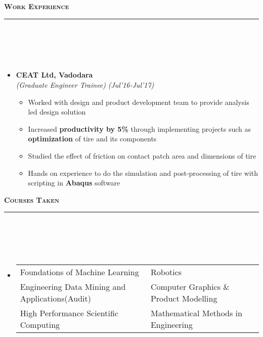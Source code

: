 \documentclass[a4paper,10pt]{article}
\newcommand{\isep}{-2 pt}
\newcommand{\lsep}{-0.5cm}
\newcommand{\resheading}[1]{{\small
        {
            \begin{minipage}
                {0.992\textwidth}\textbf{{\textsc{#1 \vphantom{p\^{E}} }}}
                \\[-0.3cm]
                \hrule
            \end{minipage}
            \\[-0.5cm]
        }
 }}
\begin{document}
\resheading{\textbf{\large Work Experience}}\\[\lsep]
\\[-0.2cm]
\begin{itemize}
    \item \textbf{CEAT Ltd, Vadodara}\\
\emph{(Graduate Engineer Trainee)} \hfill \emph{(Jul'16-Jul'17)}
        \\ [-0.6cm]
        \begin{itemize}\itemsep \isep
	\item Worked with design and product development team to provide analysis led design solution
	\item Increased \textbf{productivity by 5\%} through implementing projects such as \textbf{optimization} of tire and its components
	\item Studied the effect of friction on contact patch area and dimensions of tire
	\item Hands on experience to do the simulation and post-processing of tire with scripting in \textbf{Abaqus} software
    \end{itemize}
\end{itemize}
\vspace{-0.1cm}
\resheading{\textbf{\large Courses Taken }}\\[\lsep]
\\[-0.2cm]
\begin{itemize}
    \item[] \begin{tabular}{p{9cm}p{9cm}l }
    Foundations of Machine Learning & Robotics\\ 
    Engineering Data Mining and Applications(Audit) & Computer Graphics \& Product Modelling \\
    High Performance Scientific Computing & Mathematical Methods in Engineering
    \end{tabular}
\end{itemize}
\end{document}
